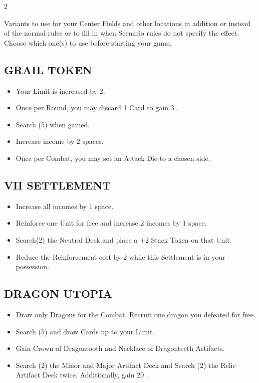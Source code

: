 
\begin{multicols*}{2}

Variants to use for your Center Fields and other locations in addition or instead of the normal rules or to fill in when Scenario rules do not specify the effect. Choose which one(s) to use before starting your game.

\subsection*{\MakeUppercase{Grail Token}}
\begin{itemize}
  \item Your  Limit is increased by 2.
  \item Once per Round, you may discard 1 Card to gain 3 .
  \item Search (5)  when gained.
  \item Increase  income by 2 spaces.
  \item Once per Combat, you may set an Attack Die to a chosen side.
\end{itemize}

\subsection*{\MakeUppercase{VII Settlement}}
\begin{itemize}
  \item Increase all incomes by 1 space.
  \item Reinforce one  Unit for free and increase 2 incomes by 1 space.
  \item Search(2) the  Neutral Deck and place a +2  Stack Token on that Unit.
  \item Reduce the Reinforcement cost by 2  while this Settlement is in your possession.
\end{itemize}

\subsection*{\MakeUppercase{Dragon Utopia}}
\begin{itemize}
  \item Draw only Dragons for the Combat. Recruit one dragon you defeated for free.
  \item Search (5)  and draw Cards up to your  Limit.
  \item Gain Crown of Dragontooth and Necklace of Dragonteeth Artifacts.
  \item Search (2) the Minor and Major Artifact Deck and Search (2) the Relic Artifact Deck twice. Additionally, gain 20 .
\end{itemize}


\end{multicols*}
